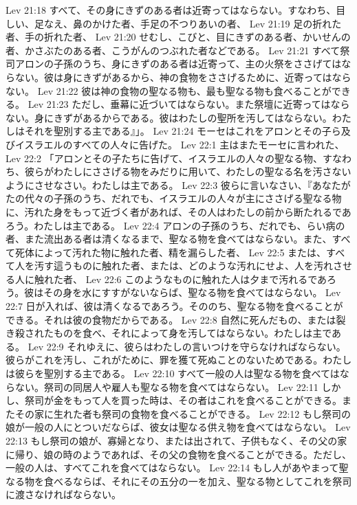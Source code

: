 Lev 21:18  すべて、その身にきずのある者は近寄ってはならない。すなわち、目しい、足なえ、鼻のかけた者、手足の不つりあいの者、
Lev 21:19  足の折れた者、手の折れた者、
Lev 21:20  せむし、こびと、目にきずのある者、かいせんの者、かさぶたのある者、こうがんのつぶれた者などである。
Lev 21:21  すべて祭司アロンの子孫のうち、身にきずのある者は近寄って、主の火祭をささげてはならない。彼は身にきずがあるから、神の食物をささげるために、近寄ってはならない。
Lev 21:22  彼は神の食物の聖なる物も、最も聖なる物も食べることができる。
Lev 21:23  ただし、垂幕に近づいてはならない。また祭壇に近寄ってはならない。身にきずがあるからである。彼はわたしの聖所を汚してはならない。わたしはそれを聖別する主である』」。
Lev 21:24  モーセはこれをアロンとその子ら及びイスラエルのすべての人々に告げた。
Lev 22:1  主はまたモーセに言われた、
Lev 22:2  「アロンとその子たちに告げて、イスラエルの人々の聖なる物、すなわち、彼らがわたしにささげる物をみだりに用いて、わたしの聖なる名を汚さないようにさせなさい。わたしは主である。
Lev 22:3  彼らに言いなさい、『あなたがたの代々の子孫のうち、だれでも、イスラエルの人々が主にささげる聖なる物に、汚れた身をもって近づく者があれば、その人はわたしの前から断たれるであろう。わたしは主である。
Lev 22:4  アロンの子孫のうち、だれでも、らい病の者、また流出ある者は清くなるまで、聖なる物を食べてはならない。また、すべて死体によって汚れた物に触れた者、精を漏らした者、
Lev 22:5  または、すべて人を汚す這うものに触れた者、または、どのような汚れにせよ、人を汚れさせる人に触れた者、
Lev 22:6  このようなものに触れた人は夕まで汚れるであろう。彼はその身を水にすすがないならば、聖なる物を食べてはならない。
Lev 22:7  日が入れば、彼は清くなるであろう。そののち、聖なる物を食べることができる。それは彼の食物だからである。
Lev 22:8  自然に死んだもの、または裂き殺されたものを食べ、それによって身を汚してはならない。わたしは主である。
Lev 22:9  それゆえに、彼らはわたしの言いつけを守らなければならない。彼らがこれを汚し、これがために、罪を獲て死ぬことのないためである。わたしは彼らを聖別する主である。
Lev 22:10  すべて一般の人は聖なる物を食べてはならない。祭司の同居人や雇人も聖なる物を食べてはならない。
Lev 22:11  しかし、祭司が金をもって人を買った時は、その者はこれを食べることができる。またその家に生れた者も祭司の食物を食べることができる。
Lev 22:12  もし祭司の娘が一般の人にとついだならば、彼女は聖なる供え物を食べてはならない。
Lev 22:13  もし祭司の娘が、寡婦となり、または出されて、子供もなく、その父の家に帰り、娘の時のようであれば、その父の食物を食べることができる。ただし、一般の人は、すべてこれを食べてはならない。
Lev 22:14  もし人があやまって聖なる物を食べるならば、それにその五分の一を加え、聖なる物としてこれを祭司に渡さなければならない。
